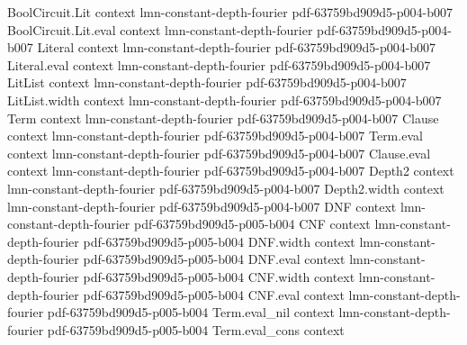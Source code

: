 \begin{lemma}
\label{BooleanAnalysis.ThresholdFunctions.MultilinearPolynomial.eval_fourierCoeff}
\leanok
{}
\proofstep
  {BoolCircuit.Lit}
  {context}
  {lmn-constant-depth-fourier}
  {pdf-63759bd909d5-p004-b007}
\proofstep
  {BoolCircuit.Lit.eval}
  {context}
  {lmn-constant-depth-fourier}
  {pdf-63759bd909d5-p004-b007}
\proofstep
  {Literal}
  {context}
  {lmn-constant-depth-fourier}
  {pdf-63759bd909d5-p004-b007}
\proofstep
  {Literal.eval}
  {context}
  {lmn-constant-depth-fourier}
  {pdf-63759bd909d5-p004-b007}
\proofstep
  {LitList}
  {context}
  {lmn-constant-depth-fourier}
  {pdf-63759bd909d5-p004-b007}
\proofstep
  {LitList.width}
  {context}
  {lmn-constant-depth-fourier}
  {pdf-63759bd909d5-p004-b007}
\proofstep
  {Term}
  {context}
  {lmn-constant-depth-fourier}
  {pdf-63759bd909d5-p004-b007}
\proofstep
  {Clause}
  {context}
  {lmn-constant-depth-fourier}
  {pdf-63759bd909d5-p004-b007}
\proofstep
  {Term.eval}
  {context}
  {lmn-constant-depth-fourier}
  {pdf-63759bd909d5-p004-b007}
\proofstep
  {Clause.eval}
  {context}
  {lmn-constant-depth-fourier}
  {pdf-63759bd909d5-p004-b007}
\proofstep
  {Depth2}
  {context}
  {lmn-constant-depth-fourier}
  {pdf-63759bd909d5-p004-b007}
\proofstep
  {Depth2.width}
  {context}
  {lmn-constant-depth-fourier}
  {pdf-63759bd909d5-p004-b007}
\proofstep
  {DNF}
  {context}
  {lmn-constant-depth-fourier}
  {pdf-63759bd909d5-p005-b004}
\proofstep
  {CNF}
  {context}
  {lmn-constant-depth-fourier}
  {pdf-63759bd909d5-p005-b004}
\proofstep
  {DNF.width}
  {context}
  {lmn-constant-depth-fourier}
  {pdf-63759bd909d5-p005-b004}
\proofstep
  {DNF.eval}
  {context}
  {lmn-constant-depth-fourier}
  {pdf-63759bd909d5-p005-b004}
\proofstep
  {CNF.width}
  {context}
  {lmn-constant-depth-fourier}
  {pdf-63759bd909d5-p005-b004}
\proofstep
  {CNF.eval}
  {context}
  {lmn-constant-depth-fourier}
  {pdf-63759bd909d5-p005-b004}
\proofstep
  {Term.eval_nil}
  {context}
  {lmn-constant-depth-fourier}
  {pdf-63759bd909d5-p005-b004}
\proofstep
  {Term.eval_cons}
  {context}

\end{lemma}
